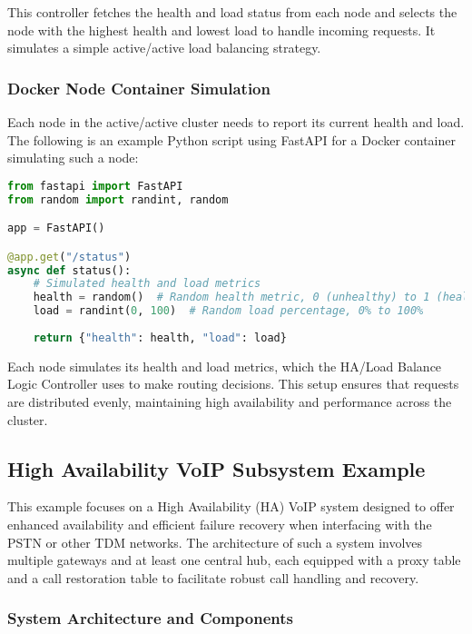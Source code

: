 \documentclass[12pt]{article}
\begin{document}
This controller fetches the health and load status from each node and selects the node with the highest health and lowest load to handle incoming requests. It simulates a simple active/active load balancing strategy.

\subsubsection{Docker Node Container Simulation}

Each node in the active/active cluster needs to report its current health and load. The following is an example Python script using FastAPI for a Docker container simulating such a node:

\begin{lstlisting}[language=Python, caption=Docker Node Container Simulation]
from fastapi import FastAPI
from random import randint, random

app = FastAPI()

@app.get("/status")
async def status():
    # Simulated health and load metrics
    health = random()  # Random health metric, 0 (unhealthy) to 1 (healthy)
    load = randint(0, 100)  # Random load percentage, 0% to 100%
    
    return {"health": health, "load": load}
\end{lstlisting}

Each node simulates its health and load metrics, which the HA/Load Balance Logic Controller uses to make routing decisions. This setup ensures that requests are distributed evenly, maintaining high availability and performance across the cluster.


\subsection{High Availability VoIP Subsystem Example}

This example focuses on a High Availability (HA) VoIP system designed to offer enhanced availability and efficient failure recovery when interfacing with the PSTN or other TDM networks. The architecture of such a system involves multiple gateways and at least one central hub, each equipped with a proxy table and a call restoration table to facilitate robust call handling and recovery.

\subsubsection{System Architecture and Components}
\end{document}
